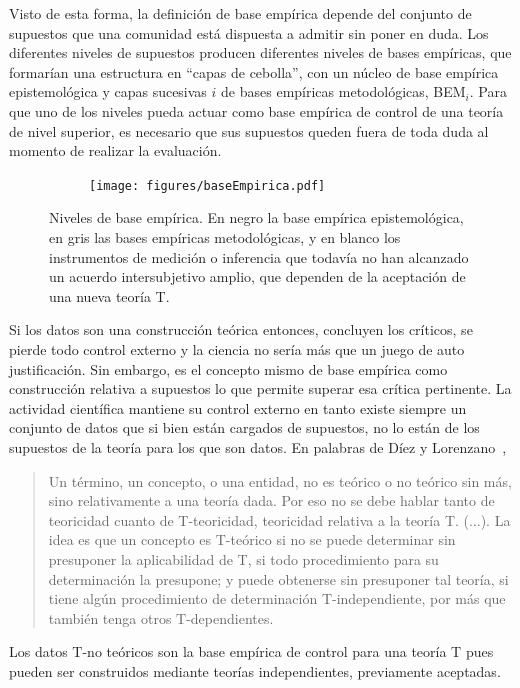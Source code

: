 \documentclass[a4paper,11pt]{book}
\theoremstyle{definition}
\begin{document}

Visto de esta forma, la definici\'on de base emp\'irica depende del conjunto de supuestos que una comunidad est\'a dispuesta a admitir sin poner en duda.
%
Los diferentes niveles de supuestos producen diferentes niveles de bases emp\'iricas, que formar\'ian una estructura en ``capas de cebolla'', con un n\'ucleo de base emp\'irica epistemol\'ogica y capas sucesivas $i$ de bases emp\'iricas metodol\'ogicas, BEM$_i$.
%
Para que uno de los niveles pueda actuar como base emp\'irica de control de una teor\'ia de nivel superior, es necesario que sus supuestos queden fuera de toda duda al momento de realizar la evaluaci\'on.
\begin{figure}[ht!]
    \centering
    \begin{subfigure}[b]{0.48\textwidth}
    \texttt{[image: figures/baseEmpirica.pdf]}
    \end{subfigure}
    \caption{Niveles de base emp\'irica. En negro la base emp\'irica epistemol\'ogica, en gris las bases emp\'iricas metodol\'ogicas, y en blanco los instrumentos de medici\'on o inferencia que todav\'ia no han alcanzado un acuerdo intersubjetivo amplio, que dependen de la aceptaci\'on de una nueva teor\'ia T.}
\end{figure}


Si los datos son una construcci\'on te\'orica entonces, concluyen los cr\'iticos, se pierde todo control externo y la ciencia no ser\'ia m\'as que un juego de auto justificaci\'on.
%
Sin embargo, es el concepto mismo de base emp\'irica como construcci\'on relativa a supuestos lo que permite superar esa cr\'itica pertinente.
%
La actividad cient\'ifica mantiene su control externo en tanto existe siempre un conjunto de datos que si bien est\'an cargados de supuestos, no lo est\'an de los supuestos de la teor\'ia para los que son datos.
%
En palabras de D\'iez y Lorenzano~\cite{lorenzano2002-concepcionEstructuralista},
%
\begin{quotation}
Un t\'ermino, un concepto, o una entidad, no es te\'orico o no te\'orico sin m\'as, sino relativamente a una teor\'ia dada.
Por eso no se debe hablar tanto de teoricidad cuanto de T-teoricidad, teoricidad relativa a la teor\'ia T. (...).
La idea es que un concepto es T-te\'orico si no se puede determinar sin presuponer la aplicabilidad de T, si todo procedimiento para su determinaci\'on la presupone; y puede obtenerse sin presuponer tal teor\'ia, si tiene alg\'un procedimiento de determinaci\'on T-independiente, por m\'as que tambi\'en tenga otros T-dependientes.
\end{quotation}
%
Los datos T-no te\'oricos son la base emp\'irica de control para una teor\'ia T pues pueden ser construidos mediante teor\'ias independientes, previamente aceptadas.
\end{document}

